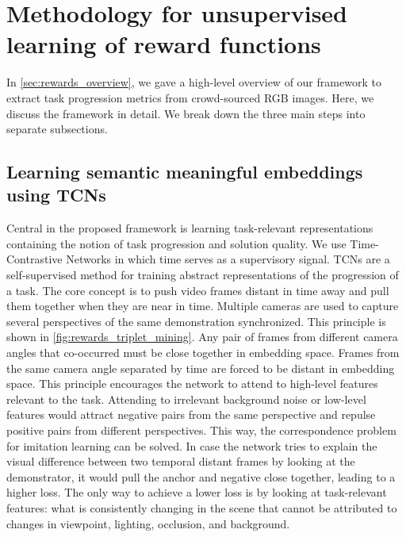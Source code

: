 \documentclass[\home/main.tex]{subfiles}
\begin{document}

\section{Methodology for unsupervised learning of reward functions}\label{sec:rewards_methodology}
In \cref{sec:rewards_overview}, we gave a high-level overview of our framework to extract task progression metrics from crowd-sourced RGB images. Here, we discuss the framework in detail. We break down the three main steps into separate subsections.

\subsection{Learning semantic meaningful embeddings using TCNs}\label{subsec:rewards_tcn}

Central in the proposed framework is learning task-relevant representations containing the notion of task progression and solution quality. We use Time-Contrastive Networks \autocite{Sermanet2017TCN} in which time serves as a supervisory signal. TCNs are a self-supervised method for training abstract representations of the progression of a task. The core concept is to push video frames distant in time away and pull them together when they are near in time. Multiple cameras are used to capture several perspectives of the same demonstration synchronized. This principle is shown in \cref{fig:rewards_triplet_mining}. Any pair of frames from different camera angles that co-occurred must be close together in embedding space. Frames from the same camera angle separated by time are forced to be distant in embedding space. This principle encourages the network to attend to high-level features relevant to the task.
Attending to irrelevant background noise or low-level features would attract negative pairs from the same perspective and repulse positive pairs from different perspectives. This way, the correspondence problem \autocite{BrassHeyes2005} for imitation learning can be solved. In case the network tries to explain the visual difference between two temporal distant frames by looking at the demonstrator, it would pull the anchor and negative close together, leading to a higher loss. The only way to achieve a lower loss is by looking at task-relevant features: what is consistently changing in the scene that cannot be attributed to changes in viewpoint, lighting, occlusion, and background.
\end{document}
